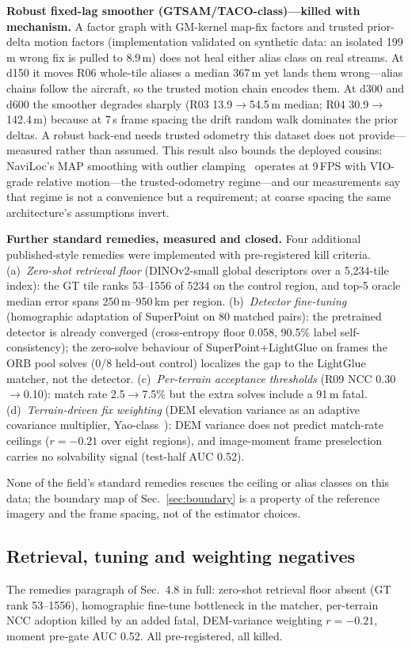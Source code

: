 \documentclass[journal]{IEEEtran}
\begin{document}
\textbf{Robust fixed-lag smoother (GTSAM/TACO-class)---killed with mechanism.} A factor graph with GM-kernel map-fix factors and trusted prior-delta motion factors (implementation validated on synthetic data: an isolated 199\,m wrong fix is pulled to 8.9\,m) does not heal either alias class on real streams. At d150 it moves R06 whole-tile aliases a median 367\,m yet lands them wrong---alias chains follow the aircraft, so the trusted motion chain encodes them. At d300 and d600 the smoother degrades sharply (R03 13.9$\to$54.5\,m median; R04 30.9$\to$142.4\,m) because at 7\,s frame spacing the drift random walk dominates the prior deltas. A robust back-end needs trusted odometry this dataset does not provide---measured rather than assumed. This result also bounds the deployed cousins: NaviLoc's MAP smoothing with outlier clamping~\cite{naviloc} operates at 9\,FPS with VIO-grade relative motion---the trusted-odometry regime---and our measurements say that regime is not a convenience but a requirement; at coarse spacing the same architecture's assumptions invert.

\textbf{Further standard remedies, measured and closed.} Four additional published-style remedies were implemented with pre-registered kill criteria. (a)~\emph{Zero-shot retrieval floor} (DINOv2-small global descriptors over a 5{,}234-tile index): the GT tile ranks 53--1556 of 5234 on the control region, and top-5 oracle median error spans 250\,m--950\,km per region. (b)~\emph{Detector fine-tuning} (homographic adaptation of SuperPoint on 80 matched pairs): the pretrained detector is already converged (cross-entropy floor 0.058, 90.5\% label self-consistency); the zero-solve behaviour of SuperPoint+LightGlue on frames the ORB pool solves (0/8 held-out control) localizes the gap to the LightGlue matcher, not the detector. (c)~\emph{Per-terrain acceptance thresholds} (R09 NCC 0.30$\to$0.10): match rate 2.5$\to$7.5\% but the extra solves include a 91\,m fatal. (d)~\emph{Terrain-driven fix weighting} (DEM elevation variance as an adaptive covariance multiplier, Yao-class~\cite{yao2024}): DEM variance does not predict match-rate ceilings ($r=-0.21$ over eight regions), and image-moment frame preselection carries no solvability signal (test-half AUC 0.52).

None of the field's standard remedies rescues the ceiling or alias classes on this data; the boundary map of Sec.~\ref{sec:boundary} is a property of the reference imagery and the frame spacing, not of the estimator choices.


\subsection{Retrieval, tuning and weighting negatives}
\label{sec:app-negatives}
The remedies paragraph of Sec.~4.8 in full: zero-shot retrieval floor absent (GT rank 53--1556), homographic fine-tune bottleneck in the matcher, per-terrain NCC adoption killed by an added fatal, DEM-variance weighting $r=-0.21$, moment pre-gate AUC 0.52. All pre-registered, all killed.
\end{document}
